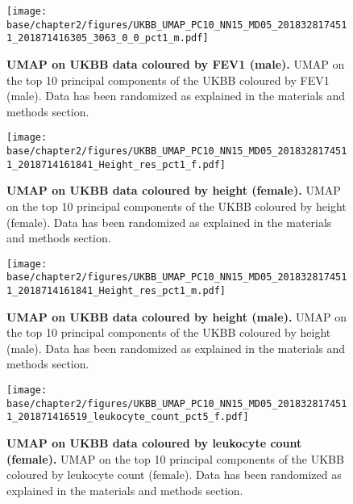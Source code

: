 \newpage

\begin{figure}[ht]
    \centering
    \texttt{[image: base/chapter2/figures/UKBB\_UMAP\_PC10\_NN15\_MD05\_2018328174511\_201871416305\_3063\_0\_0\_pct1\_m.pdf]}
    \caption[UMAP on UKBB data coloured by FEV1 (male)]{\textbf{UMAP on UKBB data coloured by FEV1 (male).} UMAP on the top 10 principal components of the UKBB coloured by FEV1 (male). Data has been randomized as explained in the materials and methods section.}
    \label{fig:supp_ukbb_fev_m}
\end{figure}

\newpage

\begin{figure}[ht]
    \centering
    \texttt{[image: base/chapter2/figures/UKBB\_UMAP\_PC10\_NN15\_MD05\_2018328174511\_2018714161841\_Height\_res\_pct1\_f.pdf]}
    \caption[UMAP on UKBB data coloured by height (female)]{\textbf{UMAP on UKBB data coloured by height (female).} UMAP on the top 10 principal components of the UKBB coloured by height (female). Data has been randomized as explained in the materials and methods section.}
    \label{fig:supp_ukbb_height_f}
\end{figure}

\newpage

\begin{figure}[ht]
    \centering
    \texttt{[image: base/chapter2/figures/UKBB\_UMAP\_PC10\_NN15\_MD05\_2018328174511\_2018714161841\_Height\_res\_pct1\_m.pdf]}
    \caption[UMAP on UKBB data coloured by height (male)]{\textbf{UMAP on UKBB data coloured by height (male).} UMAP on the top 10 principal components of the UKBB coloured by height (male). Data has been randomized as explained in the materials and methods section.}
    \label{fig:supp_ukbb_height_m}
\end{figure}

\newpage

\begin{figure}[ht]
    \centering
    \texttt{[image: base/chapter2/figures/UKBB\_UMAP\_PC10\_NN15\_MD05\_2018328174511\_201871416519\_leukocyte\_count\_pct5\_f.pdf]}
    \caption[UMAP on UKBB data coloured by leukocyte count (female)]{\textbf{UMAP on UKBB data coloured by leukocyte count (female).} UMAP on the top 10 principal components of the UKBB coloured by leukocyte count (female). Data has been randomized as explained in the materials and methods section.}
    \label{fig:supp_ukbb_leukocyte_f}
\end{figure}

